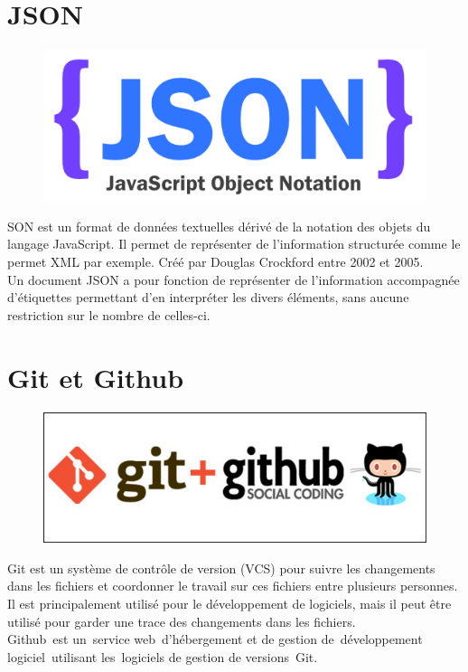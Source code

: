 \documentclass[12pt,a4paper]{report}
\begin{document}
		\newpage	

		\section{JSON}
		\begin{figure}
		\includegraphics[scale=0.3]{./graphics/json.png}
		\end{figure}
SON est un format de données textuelles dérivé de la notation des objets du
langage JavaScript. Il permet de représenter de l’information structurée comme le permet XML par
exemple. Créé par Douglas Crockford entre 2002 et 2005.\\
Un document JSON a pour fonction de représenter de l'information accompagnée d'étiquettes
permettant d'en interpréter les divers éléments, sans aucune restriction sur le nombre de celles-ci.
		
		\section{Git et Github}
		\begin{figure}
		\includegraphics[scale=0.25]{./graphics/gitgithub.jpg}
		\end{figure}
		Git est un système de contrôle de version (VCS) pour suivre les changements dans les fichiers et coordonner le travail sur ces fichiers entre plusieurs personnes. Il est principalement utilisé pour le développement de logiciels, mais il peut être utilisé pour garder une trace des changements dans les fichiers.\\
Github est un service web d'hébergement et de gestion de développement logiciel utilisant les logiciels de gestion de versions Git.
\end{document}
